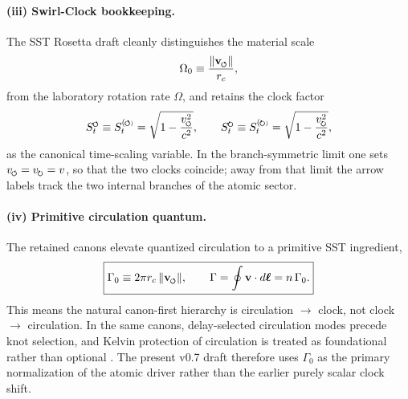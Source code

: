 \documentclass[11pt,a4paper]{article}
\newcommand{\swirlarrow}{\mathchoice{\mkern-2mu\scriptstyle\boldsymbol{\circlearrowleft}}{\mkern-2mu\scriptstyle\boldsymbol{\circlearrowleft}}{\mkern-2mu\scriptscriptstyle\boldsymbol{\circlearrowleft}}{\mkern-2mu\scriptscriptstyle\boldsymbol{\circlearrowleft}}}
\newcommand{\swirlarrowcw}{\mathchoice{\mkern-2mu\scriptstyle\boldsymbol{\circlearrowright}}{\mkern-2mu\scriptstyle\boldsymbol{\circlearrowright}}{\mkern-2mu\scriptscriptstyle\boldsymbol{\circlearrowright}}{\mkern-2mu\scriptscriptstyle\boldsymbol{\circlearrowright}}}
\newcommand{\vswirl}{\mathbf{v}_{\swirlarrow}}
\newcommand{\SwirlClock}{S_t^{\swirlarrow}}
\newcommand{\SwirlClockcw}{S_t^{\swirlarrowcw}}
\newcommand{\rc}{r_c}
\begin{document}
\paragraph{(iii) Swirl-Clock bookkeeping.} The SST Rosetta draft cleanly distinguishes the material scale
\begin{equation}
\label{eq:Omega0}
\Omega_0 \equiv \frac{\lVert \vswirl\rVert}{\rc},
\end{equation}
from the laboratory rotation rate $\Omega$, and retains the clock factor
\begin{equation}
\label{eq:SwirlClock}
\SwirlClock \equiv S_t^{(\swirlarrow)} = \sqrt{1-\frac{v_{\swirlarrow}^{2}}{c^2}},
\qquad
\SwirlClockcw \equiv S_t^{(\swirlarrowcw)} = \sqrt{1-\frac{v_{\swirlarrowcw}^{2}}{c^2}},
\end{equation}
as the canonical time-scaling variable. In the branch-symmetric limit one sets $v_{\swirlarrow}=v_{\swirlarrowcw}=v$, so that the two clocks coincide; away from that limit the arrow labels track the two internal branches of the atomic sector.

\paragraph{(iv) Primitive circulation quantum.} The retained canons elevate quantized circulation to a primitive SST ingredient,
\begin{equation}
\label{eq:Gamma0}
\boxed{
\Gamma_0 \equiv 2\pi \rc\,\lVert \vswirl\rVert,
\qquad
\Gamma = \oint \mathbf v\cdot d\boldsymbol\ell = n\,\Gamma_0.
}
\end{equation}
This means the natural canon-first hierarchy is circulation $\to$ clock, not clock $\to$ circulation. In the same canons, delay-selected circulation modes precede knot selection, and Kelvin protection of circulation is treated as foundational rather than optional \cite{IskandaraniCanon078,IskandaraniCanon060}. The present v0.7 draft therefore uses $\Gamma_0$ as the primary normalization of the atomic driver rather than the earlier purely scalar clock shift.
\end{document}
